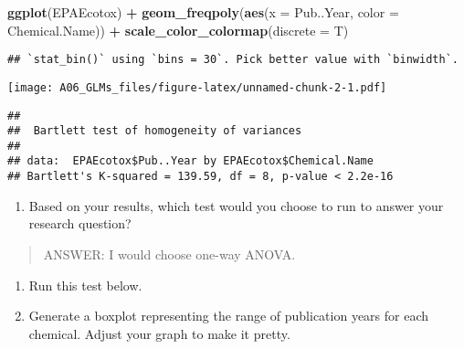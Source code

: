 \documentclass[]{article}
\newenvironment{Shaded}{\begin{snugshade}}{\end{snugshade}}
\newcommand{\KeywordTok}[1]{\textcolor[rgb]{0.13,0.29,0.53}{\textbf{#1}}}
\newcommand{\DataTypeTok}[1]{\textcolor[rgb]{0.13,0.29,0.53}{#1}}
\newcommand{\StringTok}[1]{\textcolor[rgb]{0.31,0.60,0.02}{#1}}
\newcommand{\CommentTok}[1]{\textcolor[rgb]{0.56,0.35,0.01}{\textit{#1}}}
\newcommand{\OperatorTok}[1]{\textcolor[rgb]{0.81,0.36,0.00}{\textbf{#1}}}
\newcommand{\NormalTok}[1]{#1}
\providecommand{\tightlist}{%
  \setlength{\itemsep}{0pt}\setlength{\parskip}{0pt}}
\begin{document}
\begin{Shaded}
\begin{Highlighting}[]
  \KeywordTok{ggplot}\NormalTok{(EPAEcotox) }\OperatorTok{+}
\StringTok{  }\KeywordTok{geom_freqpoly}\NormalTok{(}\KeywordTok{aes}\NormalTok{(}\DataTypeTok{x =}\NormalTok{ Pub..Year, }\DataTypeTok{color =}\NormalTok{ Chemical.Name)) }\OperatorTok{+}
\StringTok{  }\KeywordTok{scale_color_colormap}\NormalTok{(}\DataTypeTok{discrete =}\NormalTok{ T)}
\end{Highlighting}
\end{Shaded}

\begin{verbatim}
## `stat_bin()` using `bins = 30`. Pick better value with `binwidth`.
\end{verbatim}

\texttt{[image: A06\_GLMs\_files/figure-latex/unnamed-chunk-2-1.pdf]}

\begin{Shaded}
\end{Shaded}

\begin{verbatim}
## 
##  Bartlett test of homogeneity of variances
## 
## data:  EPAEcotox$Pub..Year by EPAEcotox$Chemical.Name
## Bartlett's K-squared = 139.59, df = 8, p-value < 2.2e-16
\end{verbatim}

\begin{enumerate}
\def\labelenumi{\arabic{enumi}.}
\setcounter{enumi}{5}
\tightlist
\item
  Based on your results, which test would you choose to run to answer
  your research question?
\end{enumerate}

\begin{quote}
ANSWER: I would choose one-way ANOVA.
\end{quote}

\begin{enumerate}
\def\labelenumi{\arabic{enumi}.}
\setcounter{enumi}{6}
\item
  Run this test below.
\item
  Generate a boxplot representing the range of publication years for
  each chemical. Adjust your graph to make it pretty.
\end{enumerate}
\end{document}
